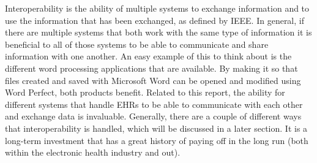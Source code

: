 \documentclass[14pt]{article}
\begin{document}
Interoperability is the ability of multiple systems to exchange information and to use the information that has been exchanged, as defined by \gls{IEEE}.  In general, if there are multiple systems that both work with the same type of information it is beneficial to all of those systems to be able to communicate and share information with one another.  An easy example of this to think about is the different word processing applications that are available.  By making it so that files created and saved with Microsoft Word can be opened and modified using Word Perfect, both products benefit.  Related to this report, the ability for different systems that handle \glspl{EHR} to be able to communicate with each other and exchange data is invaluable.  Generally, there are a couple of different ways that interoperability is handled, which will be discussed in a later section.  It is a long-term investment that has a great history of paying off in the long run (both within the electronic health industry and out).

\label{sec:interopDefinition}
\end{document}
